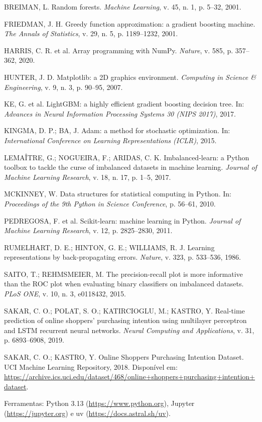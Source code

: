 \documentclass[11pt,a4paper]{article}
\begin{document}
\begin{list}{}{\setlength{\leftmargin}{1.2em}\setlength{\itemindent}{-1.2em}\setlength{\itemsep}{4pt}}
  \item BREIMAN, L. Random forests. \textit{Machine Learning}, v. 45, n. 1, p. 5--32, 2001.
  \item FRIEDMAN, J. H. Greedy function approximation: a gradient boosting machine. \textit{The Annals of
        Statistics}, v. 29, n. 5, p. 1189--1232, 2001.
  \item HARRIS, C. R. et al. Array programming with NumPy. \textit{Nature}, v. 585, p. 357--362, 2020.
  \item HUNTER, J. D. Matplotlib: a 2D graphics environment. \textit{Computing in Science \& Engineering}, v. 9, n. 3,
        p. 90--95, 2007.
  \item KE, G. et al. LightGBM: a highly efficient gradient boosting decision tree. In: \textit{Advances in Neural
        Information Processing Systems 30 (NIPS 2017)}, 2017.
  \item KINGMA, D. P.; BA, J. Adam: a method for stochastic optimization. In: \textit{International Conference on
        Learning Representations (ICLR)}, 2015.
  \item LEMAÎTRE, G.; NOGUEIRA, F.; ARIDAS, C. K. Imbalanced-learn: a Python toolbox to tackle the curse of imbalanced
        datasets in machine learning. \textit{Journal of Machine Learning Research}, v. 18, n. 17, p. 1--5, 2017.
  \item MCKINNEY, W. Data structures for statistical computing in Python. In: \textit{Proceedings of the 9th Python in
        Science Conference}, p. 56--61, 2010.
  \item PEDREGOSA, F. et al. Scikit-learn: machine learning in Python. \textit{Journal of Machine Learning Research},
        v. 12, p. 2825--2830, 2011.
  \item RUMELHART, D. E.; HINTON, G. E.; WILLIAMS, R. J. Learning representations by back-propagating errors.
        \textit{Nature}, v. 323, p. 533--536, 1986.
  \item SAITO, T.; REHMSMEIER, M. The precision-recall plot is more informative than the ROC plot when evaluating
        binary classifiers on imbalanced datasets. \textit{PLoS ONE}, v. 10, n. 3, e0118432, 2015.
  \item SAKAR, C. O.; POLAT, S. O.; KATIRCIOGLU, M.; KASTRO, Y. Real-time prediction of online shoppers' purchasing
        intention using multilayer perceptron and LSTM recurrent neural networks. \textit{Neural Computing and
        Applications}, v. 31, p. 6893--6908, 2019.
  \item SAKAR, C. O.; KASTRO, Y. Online Shoppers Purchasing Intention Dataset. UCI Machine Learning Repository, 2018.
        Disponível em: \url{https://archive.ics.uci.edu/dataset/468/online+shoppers+purchasing+intention+dataset}.
  \item Ferramentas: Python 3.13 (\url{https://www.python.org}), Jupyter (\url{https://jupyter.org}) e uv
        (\url{https://docs.astral.sh/uv}).
\end{list}
\end{document}
